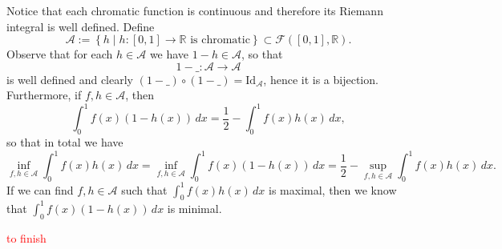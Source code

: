\begin{solution}
    Notice that each chromatic function is continuous and therefore its Riemann integral is well defined. Define
    \[
        \mathcal{A} := \left\{ h \mid h : \left[0, 1\right] \rightarrow \mathbb{R} \text{ is chromatic} \right\} \subset \mathcal{F}\left(\left[0,1\right], \mathbb{R}\right).
    \]
    Observe that for each \( h \in \mathcal{A} \) we have \( 1 - h \in \mathcal{A} \), so that
    \[
        1 - \_ : \mathcal{A} \rightarrow \mathcal{A}
    \]
    is well defined and clearly \( \left(1 - \_\right) \circ \left(1 - \_\right) = \mathrm{Id}_{\mathcal{A}} \), hence it is a bijection. Furthermore, if \( f, h \in \mathcal{A} \), then
    \[
        \int_{0}^{1} f\left(x\right) \left( 1 - h\left(x\right) \right) \, dx = \frac{1}{2} - \int_{0}^{1} f\left(x\right) h\left(x\right) \, dx,
    \]
    so that in total we have
    \[
        \inf_{f, h \in \mathcal{A}} \int_{0}^{1} f\left(x\right) h\left(x\right) \, dx = \inf_{f, h \in \mathcal{A}} \int_{0}^{1} f\left(x\right) \left( 1 - h\left(x\right) \right) \, dx = \frac{1}{2} - \sup_{f, h \in \mathcal{A}} \int_{0}^{1} f\left(x\right) h\left(x\right) \, dx.
    \]
    If we can find \( f, h\in\mathcal{A} \) such that \( \int_{0}^{1} f\left(x\right) h\left(x\right) \, dx \) is maximal, then we know that \( \displaystyle \int_{0}^{1} f\left(x\right) \left( 1 - h\left(x\right) \right) \, dx \) is minimal.

    \textcolor{red}{to finish}
\end{solution}

